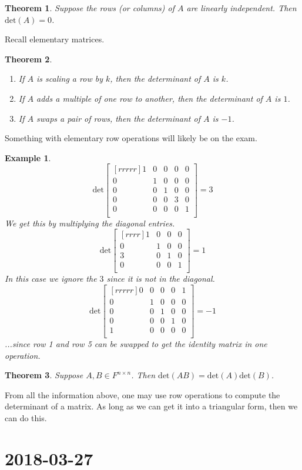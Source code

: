 \documentclass{report}
\newtheorem*{ex}{Example}
\newtheorem*{thrm}{Theorem}
\newcommand{\mychapter}[2]{
	\setcounter{chapter}{#1}
	\setcounter{section}{0}
	\chapter*{#2}
	\addcontentsline{toc}{chapter}{#2}
}
\begin{document}
\begin{thrm}
Suppose the rows (or columns) of $A$ are linearly independent. Then $\mathrm{det}(A)=0$.
\end{thrm}
Recall elementary matrices.
\begin{thrm}
\begin{enumerate}
\item If $A$ is scaling a row by $k$, then the determinant of $A$ is $k$.
\item If $A$ adds a multiple of one row to another, then the determinant of $A$ is $1$.
\item If $A$ swaps a pair of rows, then the determinant of $A$ is $-1$.
\end{enumerate}
\end{thrm}
Something with elementary row operations will likely be on the exam.
\begin{ex}
\[ \mathrm{det}\begin{bmatrix}[rrrrr]1&0&0&0&0\\0&1&0&0&0\\0&0&1&0&0\\0&0&0&3&0\\0&0&0&0&1\\\end{bmatrix} = 3 \]
We get this by multiplying the diagonal entries.
\[ \mathrm{det}\begin{bmatrix}[rrrr]1&0&0&0\\0&1&0&0\\3&0&1&0\\0&0&0&1\\\end{bmatrix} = 1 \]
In this case we ignore the $3$ since it is not in the diagonal.
\[ \mathrm{det}\begin{bmatrix}[rrrrr]0&0&0&0&1\\0&1&0&0&0\\0&0&1&0&0\\0&0&0&1&0\\1&0&0&0&0\\\end{bmatrix} = -1 \]
...since row 1 and row 5 can be swapped to get the identity matrix in one operation.
\end{ex}
\begin{thrm}
Suppose $A,B\in F^{n\times n}$. Then $\mathrm{det}(AB)=\mathrm{det}(A)\mathrm{det}(B)$.
\end{thrm}
From all the information above, one may use row operations to compute the determinant of a matrix. As long as we can get it into a triangular form, then we can do this.



\mychapter{32}{2018-03-27}
\end{document}
